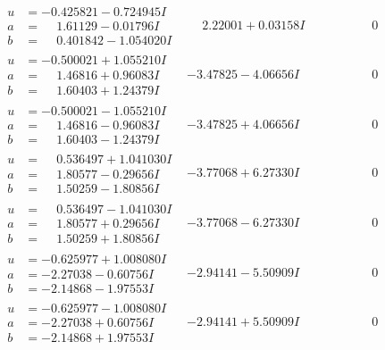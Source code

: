 \documentclass[1p]{elsarticle_modified}
\theoremstyle{definition}
\begin{document}
$$\begin{array}{c|c|c}
\begin{aligned}
u &= -0.425821 - 0.724945 I \\
a &= \phantom{-}1.61129 - 0.01796 I \\
b &= \phantom{-}0.401842 - 1.054020 I\end{aligned}
 & \phantom{-}2.22001 + 0.03158 I & \phantom{-0.000000 } 0 \\ \hline\begin{aligned}
u &= -0.500021 + 1.055210 I \\
a &= \phantom{-}1.46816 + 0.96083 I \\
b &= \phantom{-}1.60403 + 1.24379 I\end{aligned}
 & -3.47825 - 4.06656 I & \phantom{-0.000000 } 0 \\ \hline\begin{aligned}
u &= -0.500021 - 1.055210 I \\
a &= \phantom{-}1.46816 - 0.96083 I \\
b &= \phantom{-}1.60403 - 1.24379 I\end{aligned}
 & -3.47825 + 4.06656 I & \phantom{-0.000000 } 0 \\ \hline\begin{aligned}
u &= \phantom{-}0.536497 + 1.041030 I \\
a &= \phantom{-}1.80577 - 0.29656 I \\
b &= \phantom{-}1.50259 - 1.80856 I\end{aligned}
 & -3.77068 + 6.27330 I & \phantom{-0.000000 } 0 \\ \hline\begin{aligned}
u &= \phantom{-}0.536497 - 1.041030 I \\
a &= \phantom{-}1.80577 + 0.29656 I \\
b &= \phantom{-}1.50259 + 1.80856 I\end{aligned}
 & -3.77068 - 6.27330 I & \phantom{-0.000000 } 0 \\ \hline\begin{aligned}
u &= -0.625977 + 1.008080 I \\
a &= -2.27038 - 0.60756 I \\
b &= -2.14868 - 1.97553 I\end{aligned}
 & -2.94141 - 5.50909 I & \phantom{-0.000000 } 0 \\ \hline\begin{aligned}
u &= -0.625977 - 1.008080 I \\
a &= -2.27038 + 0.60756 I \\
b &= -2.14868 + 1.97553 I\end{aligned}
 & -2.94141 + 5.50909 I & \phantom{-0.000000 } 0 \\ \hline\begin{aligned}

\end{aligned}
\end{array}$$
\end{document}
